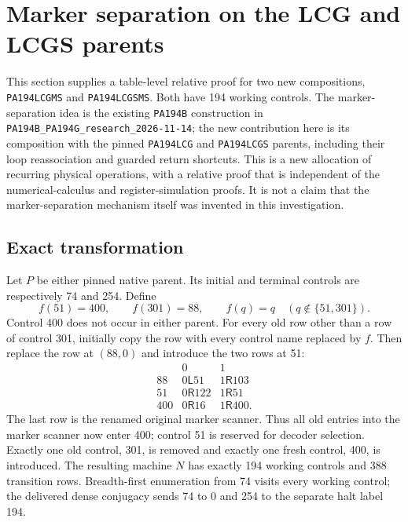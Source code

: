 \section{Marker separation on the LCG and LCGS parents}
\label{sec:marker-separation}

This section supplies a table-level relative proof for two new compositions,
\texttt{PA194LCGMS} and \texttt{PA194LCGSMS}.  Both have 194 working controls.
The marker-separation idea is the existing \texttt{PA194B} construction in
\texttt{PA194B\_PA194G\_research\_2026-11-14}; the new contribution here is its
composition with the pinned \texttt{PA194LCG} and \texttt{PA194LCGS} parents,
including their loop reassociation and guarded return shortcuts.  This is a
new allocation of recurring physical operations, with a relative proof that
is independent of the numerical-calculus and register-simulation proofs.
It is not a claim that the marker-separation mechanism itself was invented
in this investigation.

\subsection{Exact transformation}
Let $P$ be either pinned native parent.  Its initial and terminal controls
are respectively 74 and 254.  Define
\[
 f(51)=400,\qquad f(301)=88,\qquad f(q)=q
 \quad(q\notin\{51,301\}).
\]
Control 400 does not occur in either parent.  For every old row other than a
row of control 301, initially copy the row with every control name replaced
by $f$.  Then replace the row at $(88,0)$ and introduce the two rows at 51:
\[
 \begin{array}{c|cc}
       &0&1\\\hline
 88&0\mathsf L51&1\mathsf R103\\
 51&0\mathsf R122&1\mathsf R51\\
 400&0\mathsf R16&1\mathsf R400.
 \end{array}
\]
The last row is the renamed original marker scanner.  Thus all old entries
into the marker scanner now enter 400; control 51 is reserved for decoder
selection.  Exactly one old control, 301, is removed and exactly one fresh
control, 400, is introduced.  The resulting machine $N$ has exactly 194
working controls and 388 transition rows.  Breadth-first enumeration from
74 visits every working control; the delivered dense conjugacy sends 74 to
0 and 254 to the separate halt label 194.

